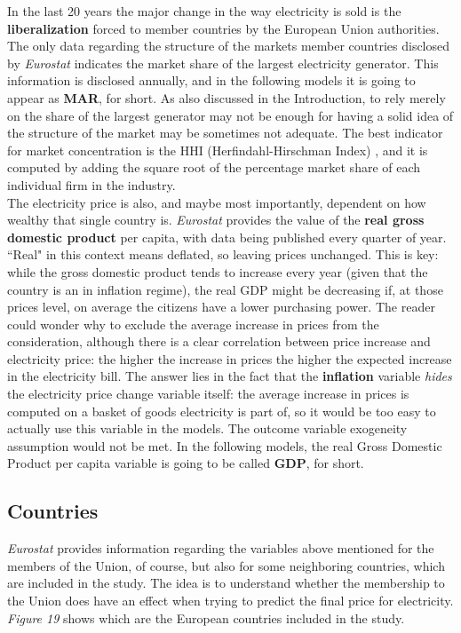 \documentclass{book}
\begin{document}
\noindent In the last 20 years the major change in the way electricity is sold is the \textbf{liberalization} forced to member countries by the European Union authorities. The only data regarding the structure of the markets member countries disclosed by \textit{Eurostat} indicates the market share of the largest electricity generator. This information is disclosed annually, and in the following models it is going to appear as \textbf{MAR}, for short. As also discussed in the Introduction, to rely merely on the share of the largest generator may not be enough for having a solid idea of the structure of the market may be sometimes not adequate. The best indicator for market concentration is the HHI (Herfindahl-Hirschman Index) \cite{viscusi2018economics}, and it is computed by adding the square root of the percentage market share of each individual firm in the industry.\\

\noindent The electricity price is also, and maybe most importantly, dependent on how wealthy that single country is. \textit{Eurostat} provides the value of the \textbf{real gross domestic product} per capita, with data being published every quarter of year. ``Real" in this context means deflated, so leaving prices unchanged. This is key: while the gross domestic product tends to increase every year (given that the country is an in inflation regime), the real GDP might be decreasing if, at those prices level, on average the citizens have a lower purchasing power. The reader could wonder why to exclude the average increase in prices from the consideration, although there is a clear correlation between price increase and electricity price: the higher the increase in prices the higher the expected increase in the electricity bill. The answer lies in the fact that the \textbf{inflation} variable \textit{hides} the electricity price change variable itself: the average increase in prices is computed on a basket of goods electricity is part of, so it would be too easy to actually use this variable in the models. The outcome variable exogeneity assumption would not be met. In the following models, the real Gross Domestic Product per capita variable is going to be called \textbf{GDP}, for short.

\subsection{Countries}

\textit{Eurostat} provides information regarding the variables above mentioned for the members of the Union, of course, but also for some neighboring countries, which are included in the study. The idea is to understand whether the membership to the Union does have an effect when trying to predict the final price for electricity. \textit{Figure 19} shows which are the European countries included in the study.
\end{document}
